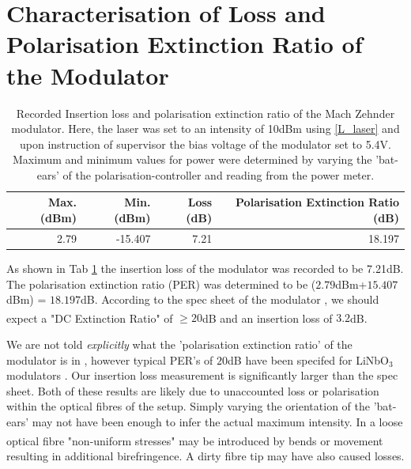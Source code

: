 \documentclass[12pt,a4paper]{report}
\begin{document}
\section{Characterisation of Loss and Polarisation Extinction Ratio of the Modulator}
\begin{table}[htbp]
  \centering
  \label{tab:sample-table}
  \begin{tabular}{rrrr}
\toprule
   \textbf{Max. (dBm)} &   \textbf{Min. (dBm)} &   \textbf{Loss (dB)} &   \textbf{Polarisation Extinction Ratio (dB)} \\
\midrule
                  2.79 &               -15.407 &                  7.21 &                            18.197 \\
\bottomrule
\end{tabular}
  \caption{Recorded Insertion loss and polarisation extinction ratio of the Mach Zehnder modulator. Here, the laser was set to an intensity of 10dBm using \ref{L_laser} and upon instruction of supervisor the bias voltage of the modulator set to 5.4V. Maximum and minimum values for power were determined by varying the ’bat-ears’ of the polarisation-controller and reading from the power meter.}
  \label{loss-ext}
\end{table}
As shown in Tab \ref{loss-ext} the insertion loss of the modulator was recorded to be 7.21dB. The polarisation extinction ratio (PER) was determined to be ($2.79$dBm+$15.407$dBm) = $18.197$dB. According to the spec sheet of the modulator \cite{modulator-spec}, we should expect a "DC Extinction Ratio" of $\geq 20$dB \textsuperscript{\cite{modulator-spec}} and an insertion loss of $3.2$dB\textsuperscript{\cite{modulator-spec}}.

We are not told \emph{explicitly} what the 'polarisation extinction ratio' of the modulator is in \cite{modulator-spec}, however typical PER's of $20$dB have been specifed for LiNbO$_{3}$ modulators \cite{PER}. Our insertion loss measurement is significantly larger than the spec sheet. Both of these results are likely due to unaccounted loss or polarisation within the optical fibres of the setup. Simply varying the orientation of the 'bat-ears' may not have been enough to infer the actual maximum intensity. In a loose optical fibre "non-uniform stresses"\textsuperscript{\cite{PER}} may be introduced by bends or movement resulting in additional birefringence. A dirty fibre tip may have also caused losses.
\end{document}
